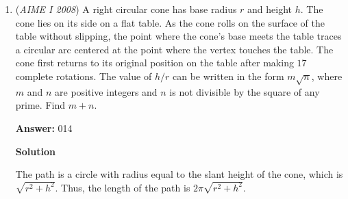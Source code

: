 \begin{enumerate}
 We have $502 - (21+f)^2 = xf$. Left hand side simplifies to $61 - 42f + f^2$. As $x$ must be an integer, $f$ must divide the left hand side. But $61$ is a prime, which only leaves two options: $f=1$ and $f=61$.

 Option $f=61$ gives us a negative $x$. Option $f=1$ gives us $x=61/f - 42 + f = 18$, and $y = x + d= x + 2e = x + 2(21+f) = 18 + 44 = 62$, hence $x+y=\boxed{080}$.

 


 



\textbf{Solution 6}

First complete the square to get $y^2 = (x+42)^2 + 244$. Remember that squares are the sums of consecutive odd integers, so when the difference between the two squares is 244, the two squares must be an even number of odd integers apart. However, there is only one distinct solution, as the problem states, and very quickly you will realize that only two odd integers work. When there are four, then the numbers are not odd, and when it is any other even integer it does not divide. So we need two consecutive odd integers that sum to 244. Easily we find 121 and 123. 121 is the 61st odd integer and 123 is the 62nd odd integer, so $(x+42)^2$ is the sum of the first 60 odd integers, or $(60)^2$, while $y^2$ is $62^2$ for the same reasons. That way we get $x=12$, $y=62$, hence $x+y=\boxed{080}$.

 
-jackshi2006

 


	\item (\textit{AIME I 2008}) A right circular cone has base radius $r$ and height $h$.  The cone lies on its side on a flat table.  As the cone rolls on the surface of the table without slipping, the point where the cone's base meets the table traces a circular arc centered  at the point where the vertex touches the table.  The cone first returns to its original position on the table after making $17$ complete rotations.  The value of $h/r$ can be written in the form $m\sqrt {n}$, where $m$ and $n$ are positive integers and $n$ is not divisible by the square of any prime.  Find $m + n$.


 
 \textbf{Answer: }014



\textbf{Solution}

The path is a circle with radius equal to the slant height of the cone, which is $\sqrt {r^{2} + h^{2}}$. Thus, the length of the path is $2\pi\sqrt {r^{2} + h^{2}}$.


\end{enumerate}
